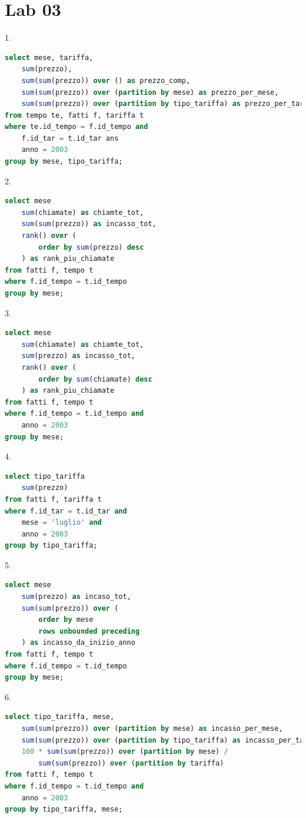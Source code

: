 \documentclass[12pt]{article}
\begin{document}
\newpage
\section{Lab 03}
1.
\begin{lstlisting}[language=sql]
select mese, tariffa,
    sum(prezzo),
    sum(sum(prezzo)) over () as prezzo_comp,
    sum(sum(prezzo)) over (partition by mese) as prezzo_per_mese,
    sum(sum(prezzo)) over (partition by tipo_tariffa) as prezzo_per_tariffa
from tempo te, fatti f, tariffa t
where te.id_tempo = f.id_tempo and
    f.id_tar = t.id_tar ans
    anno = 2003
group by mese, tipo_tariffa;
\end{lstlisting}


2.
\begin{lstlisting}[language=sql]
select mese
    sum(chiamate) as chiamte_tot,
    sum(sum(prezzo)) as incasso_tot,
    rank() over (
        order by sum(prezzo) desc
    ) as rank_piu_chiamate
from fatti f, tempo t
where f.id_tempo = t.id_tempo
group by mese;
\end{lstlisting}

3.
\begin{lstlisting}[language=sql]
select mese
    sum(chiamate) as chiamte_tot,
    sum(prezzo) as incasso_tot,
    rank() over (
        order by sum(chiamate) desc
    ) as rank_piu_chiamate
from fatti f, tempo t
where f.id_tempo = t.id_tempo and
    anno = 2003
group by mese;
\end{lstlisting}

4.
\begin{lstlisting}[language=sql]
select tipo_tariffa
    sum(prezzo)
from fatti f, tariffa t
where f.id_tar = t.id_tar and
    mese = 'luglio' and
    anno = 2003
group by tipo_tariffa;
\end{lstlisting}

5.
\begin{lstlisting}[language=sql]
select mese
    sum(prezzo) as incaso_tot,
    sum(sum(prezzo)) over (
        order by mese
        rows unbounded preceding
    ) as incasso_da_inizio_anno
from fatti f, tempo t
where f.id_tempo = t.id_tempo
group by mese;
\end{lstlisting}

6.
\begin{lstlisting}[language=sql]
select tipo_tariffa, mese,
    sum(sum(prezzo)) over (partition by mese) as incasso_per_mese,
    sum(sum(prezzo)) over (partition by tipo_tariffa) as incasso_per_tariffa,
    100 * sum(sum(prezzo)) over (partition by mese) /
        sum(sum(prezzo)) over (partition by tariffa)
from fatti f, tempo t
where f.id_tempo = t.id_tempo and
    anno = 2003
group by tipo_tariffa, mese;
\end{lstlisting}
\end{document}
